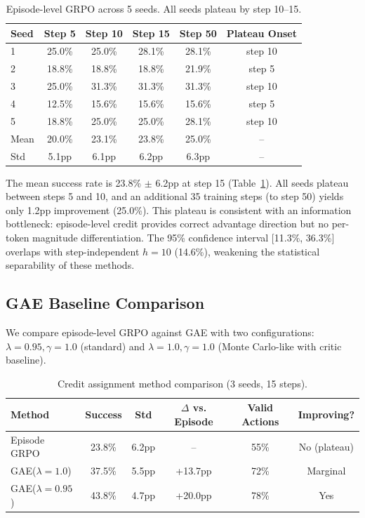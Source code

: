\documentclass[11pt]{article}
\begin{document}
\begin{table}[h]
\centering
\caption{Episode-level GRPO across 5 seeds. All seeds plateau by step 10--15.}
\label{tab:multiseed}
\begin{tabular}{lccccc}
\toprule
Seed & Step 5 & Step 10 & Step 15 & Step 50 & Plateau Onset \\
\midrule
1 & 25.0\% & 25.0\% & 28.1\% & 28.1\% & step 10 \\
2 & 18.8\% & 18.8\% & 18.8\% & 21.9\% & step 5 \\
3 & 25.0\% & 31.3\% & 31.3\% & 31.3\% & step 10 \\
4 & 12.5\% & 15.6\% & 15.6\% & 15.6\% & step 5 \\
5 & 18.8\% & 25.0\% & 25.0\% & 28.1\% & step 10 \\
\midrule
Mean & 20.0\% & 23.1\% & 23.8\% & 25.0\% & -- \\
Std  & 5.1pp  & 6.1pp  & 6.2pp  & 6.3pp  & -- \\
\bottomrule
\end{tabular}
\end{table}

The mean success rate is 23.8\% $\pm$ 6.2pp at step 15 (Table~\ref{tab:multiseed}).
All seeds plateau between steps 5 and 10, and an additional 35 training steps (to step 50) yields only 1.2pp improvement (25.0\%).
This plateau is consistent with an information bottleneck: episode-level credit provides correct advantage direction but no per-token magnitude differentiation.
The 95\% confidence interval [11.3\%, 36.3\%] overlaps with step-independent $h{=}10$ (14.6\%), weakening the statistical separability of these methods.

\subsection{GAE Baseline Comparison}

We compare episode-level GRPO against GAE with two configurations: $\lambda{=}0.95, \gamma{=}1.0$ (standard) and $\lambda{=}1.0, \gamma{=}1.0$ (Monte Carlo-like with critic baseline).

\begin{table}[h]
\centering
\caption{Credit assignment method comparison (3 seeds, 15 steps).}
\label{tab:gae}
\begin{tabular}{lccccc}
\toprule
Method & Success & Std & $\Delta$ vs. Episode & Valid Actions & Improving? \\
\midrule
Episode GRPO    & 23.8\% & 6.2pp & --      & 55\% & No (plateau) \\
GAE($\lambda{=}1.0$)  & 37.5\% & 5.5pp & +13.7pp & 72\% & Marginal \\
GAE($\lambda{=}0.95$) & 43.8\% & 4.7pp & +20.0pp & 78\% & Yes \\
\bottomrule
\end{tabular}
\end{table}
\end{document}

